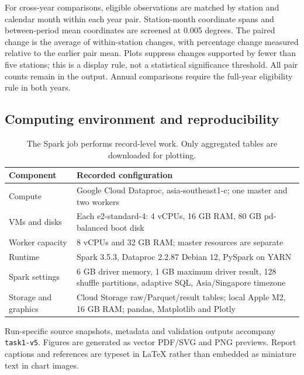 \documentclass[10pt,a4paper]{article}
\begin{document}
For cross-year comparisons, eligible observations are matched by station and calendar month within each year pair. Station-month coordinate spans and between-period mean coordinates are screened at 0.005 degrees. The paired change is the average of within-station changes, with percentage change measured relative to the earlier pair mean. Plots suppress changes supported by fewer than five stations; this is a display rule, not a statistical significance threshold. All pair counts remain in the output. Annual comparisons require the full-year eligibility rule in both years.

\subsection{Computing environment and reproducibility}
\begin{table}[H]\small\centering\begin{tabular}{p{.29\linewidth}p{.62\linewidth}}\toprule Component & Recorded configuration\\\midrule
Compute & Google Cloud Dataproc, asia-southeast1-c; one master and two workers\\
VMs and disks & Each e2-standard-4: 4 vCPUs, 16 GB RAM, 80 GB pd-balanced boot disk\\
Worker capacity & 8 vCPUs and 32 GB RAM; master resources are separate\\
Runtime & Spark 3.5.3, Dataproc 2.2.87 Debian 12, PySpark on YARN\\
Spark settings & 6 GB driver memory, 1 GB maximum driver result, 128 shuffle partitions, adaptive SQL, Asia/Singapore timezone\\
Storage and graphics & Cloud Storage raw/Parquet/result tables; local Apple M2, 16 GB RAM; pandas, Matplotlib and Plotly\\\bottomrule\end{tabular}
\caption{The Spark job performs record-level work. Only aggregated tables are downloaded for plotting.}\end{table}
Run-specific source snapshots, metadata and validation outputs accompany \texttt{task1-v5}. Figures are generated as vector PDF/SVG and PNG previews. Report captions and references are typeset in LaTeX rather than embedded as miniature text in chart images.

\clearpage
\end{document}
